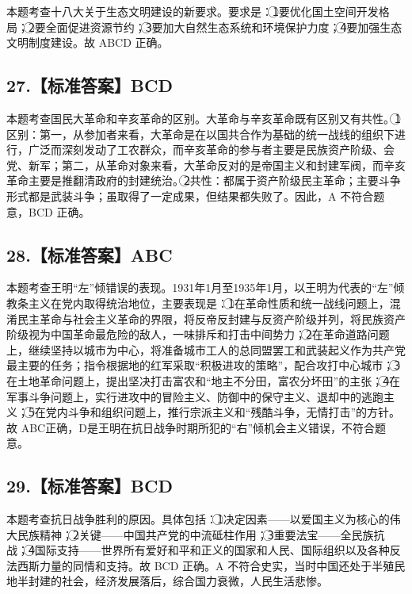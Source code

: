 \documentclass[UTF8,11pt]{ctexart}
\begin{document}
本题考查十八大关于生态文明建设的新要求。要求是：\textcircled{1}要优化国土空间开发格局；\textcircled{2}要全面促进资源节约；\textcircled{3}要加大自然生态系统和环境保护力度；\textcircled{4}要加强生态文明制度建设。故 ABCD 正确。


\subsection*{27.【标准答案】BCD}

本题考查国民大革命和辛亥革命的区别。大革命与辛亥革命既有区别又有共性。\textcircled{1}区别：第一，从参加者来看，大革命是在以国共合作为基础的统一战线的组织下进行，广泛而深刻发动了工农群众，而辛亥革命的参与者主要是民族资产阶级、会党、新军；第二，从革命对象来看，大革命反对的是帝国主义和封建军阀，而辛亥革命主要是推翻清政府的封建统治。\textcircled{2}共性：都属于资产阶级民主革命；主要斗争形式都是武装斗争；虽取得了一定成果，但结果都失败了。因此，A 不符合题意，BCD 正确。


\subsection*{28.【标准答案】ABC}

本题考查王明“左”倾错误的表现。1931年1月至1935年1月，以王明为代表的“左”倾教条主义在党内取得统治地位，主要表现是：\textcircled{1}在革命性质和统一战线问题上，混淆民主革命与社会主义革命的界限，将反帝反封建与反资产阶级并列，将民族资产阶级视为中国革命最危险的敌人，一味排斥和打击中间势力；\textcircled{2}在革命道路问题上，继续坚持以城市为中心，将准备城市工人的总同盟罢工和武装起义作为共产党最主要的任务；指令根据地的红军采取“积极进攻的策略”，配合攻打中心城市；\textcircled{3}在土地革命问题上，提出坚决打击富农和“地主不分田，富农分坏田”的主张；\textcircled{4}在军事斗争问题上，实行进攻中的冒险主义、防御中的保守主义、退却中的逃跑主义；\textcircled{5}在党内斗争和组织问题上，推行宗派主义和“残酷斗争，无情打击”的方针。故 ABC正确，D是王明在抗日战争时期所犯的“右”倾机会主义错误，不符合题意。


\subsection*{29.【标准答案】BCD}

本题考查抗日战争胜利的原因。具体包括：\textcircled{1}决定因素——以爱国主义为核心的伟大民族精神；\textcircled{2}关键——中国共产党的中流砥柱作用；\textcircled{3}重要法宝——全民族抗战；\textcircled{4}国际支持——世界所有爱好和平和正义的国家和人民、国际组织以及各种反法西斯力量的同情和支持。故 BCD 正确。A 不符合史实，当时中国还处于半殖民地半封建的社会，经济发展落后，综合国力衰微，人民生活悲惨。
\end{document}
